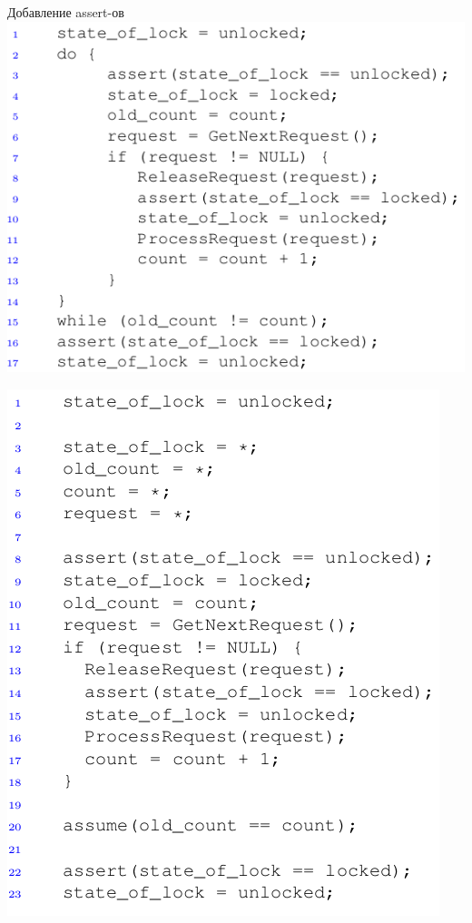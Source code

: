 \documentclass{beamer}
\begin{document}
\begin{frame}{Добавление assert-ов}
\includegraphics[scale=0.5]{asserts.png}
\end{frame}

\begin{frame}
\includegraphics[scale=0.45]{new_code1.png}
\end{frame}
\end{document}
